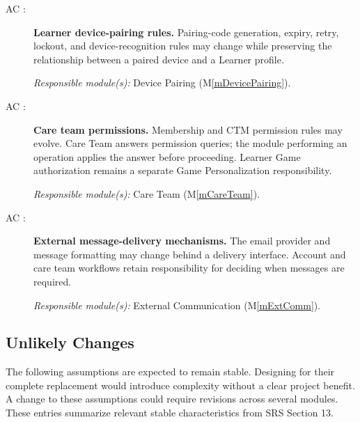 \documentclass[12pt, titlepage]{article}
\newcounter{acnum}
\newcommand{\actheacnum}{AC\theacnum}
\newcommand{\mref}[1]{M\ref{#1}}
\begin{document}
\begin{description}
\item[ \actheacnum
\label{acDevicePairing}:]
\textbf{Learner device-pairing rules.}
Pairing-code generation, expiry, retry, lockout, and device-recognition rules may change while preserving the relationship between a paired device and a Learner profile.

\textit{Responsible module(s):} Device Pairing (\mref{mDevicePairing}).

\item[ \actheacnum
\label{acAccessControl}:]
\textbf{Care team permissions.}
Membership and CTM permission rules may evolve. Care Team answers permission queries; the module performing an operation applies the answer before proceeding. Learner Game authorization remains a separate Game Personalization responsibility.

\textit{Responsible module(s):} Care Team (\mref{mCareTeam}).

\item[ \actheacnum
\label{acExternalCommunication}:]
\textbf{External message-delivery mechanisms.}
The email provider and message formatting may change behind a delivery interface. Account and care team workflows retain responsibility for deciding when messages are required.

\textit{Responsible module(s):} External Communication (\mref{mExtComm}).

\end{description}

\subsection{Unlikely Changes} \label{SecUchange}

The following assumptions are expected to remain stable. Designing for
their complete replacement would introduce complexity without a clear
project benefit. A change to these assumptions could require revisions
across several modules. These entries summarize relevant stable
characteristics from SRS Section 13.
\end{document}
